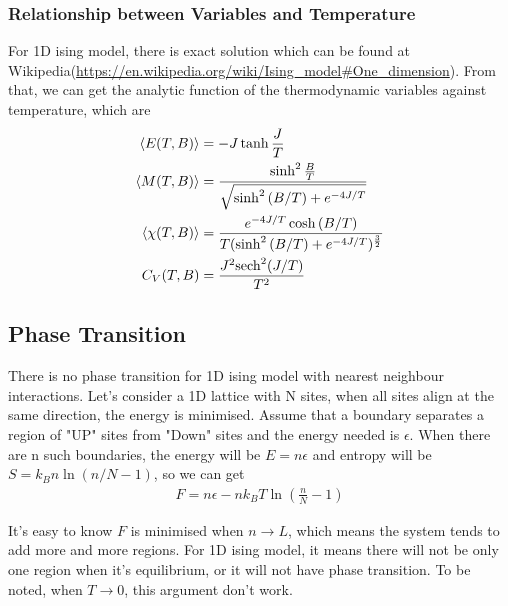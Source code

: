 \documentclass[12pt]{article}
\begin{document}
	\subsubsection{Relationship between Variables and Temperature}
	\label{subsubsec: relationship between variables and temperature}
	
	For 1D ising model, there is exact solution which can be found at Wikipedia(\url{https://en.wikipedia.org/wiki/Ising_model#One_dimension}). From that, we can get the analytic function of the thermodynamic variables against temperature, which are 
	\begin{align}\label{equ: analytic solution of variables}
		\nonumber \braket{E(T,B)}&=-J \tanh{\frac{J}{T}}\\
		\nonumber \braket{M(T,B)}&=\frac{\sinh^2{\frac{B}{T}}}{\sqrt{\sinh^2{(B/T)}+e^{-4J/T}}}\\
		\nonumber \braket{\chi(T,B)}&=\frac{e^{-4J/T} \cosh{(B/T)}}{T (\sinh^2{(B/T)}+e^{-4J/T})^\frac{3}{2}}\\
		\nonumber C_V(T,B)&=\frac{J^2 \text{sech}^2{(J/T)}}{T^2}
	\end{align}
	
	\subsection{Phase Transition}
	\label{sec: phase transition}
	There is no phase transition for 1D ising model with nearest neighbour interactions. Let's consider a 1D lattice with N sites, when all sites align at the same direction, the energy is minimised. Assume that a boundary separates a region of "UP" sites from "Down" sites and the energy needed is $\epsilon$. When there are n such boundaries, the energy will be $E=n \epsilon$ and entropy will be $S=k_B n \ln(n/N-1)$, so we can get 
	\begin{align}
		F=n\epsilon - nk_B T \ln(\frac{n}{N}-1)
	\end{align}
	
	It's easy to know $F$ is minimised when $n \to L$, which means the system tends to add more and more regions. For 1D ising model, it means there will not be only one region when it's equilibrium, or it  will not have phase transition. To be noted, when $T \to 0$, this argument don't work. 
	
\end{document}
